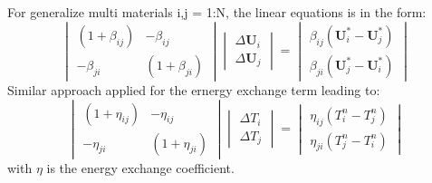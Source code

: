 \documentclass[preprint,12pt]{elsarticle}
\begin{document}
%
For generalize multi materials i,j = 1:N, the linear equations is in the form:
%
%
\[ \begin{vmatrix} (1 + \beta_{ij})  &  -\beta_{ij} \\
                  -\beta_{ji}       &  (1 + \beta_{ji})
    \end {vmatrix}
    \begin{vmatrix} \Delta \pmb{U}_{i} \\
                    \Delta \pmb{U}_{j}
    \end {vmatrix}
    =
    \begin{vmatrix}  \beta_{ij}(\pmb{U}_{i}^{*} - \pmb{U}_{j}^{*}) \\
                    \beta_{ji}(\pmb{U}_{j}^{*} - \pmb{U}_i^{*})
    \end {vmatrix}                
\]
Similar approach applied for the ernergy exchange term leading to:
%
%
\[ \begin{vmatrix} (1 + \eta_{ij})  &  -\eta_{ij} \\
                  -\eta_{ji}       &  (1 + \eta_{ji})
    \end {vmatrix}
    \begin{vmatrix} \Delta T_{i} \\
                    \Delta T_{j}
    \end {vmatrix}
    =
    \begin{vmatrix}  \eta_{ij}(T_{i}^{n} - T_{j}^{n}) \\
                    \eta_{ji}(T_{j}^{n} - T_i^{n})
    \end {vmatrix}                
\]
with $\eta$ is the energy exchange coefficient.
%
%

%
%






\end{document}
